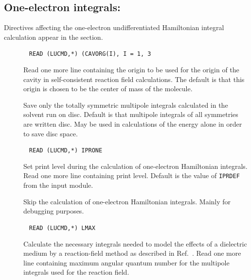 \subsection{One-electron integrals: }
\label{sec:oneinp}

Directives affecting the one-electron undifferentiated Hamiltonian
integral calculation appear in the  section.
\begin{description}
\item[]\verb| |\newline
\verb|READ (LUCMD,*) (CAVORG(I), I = 1, 3|

Read one more line containing the origin to be used for the origin of
the cavity in self-consistent reaction field
calculations. The default
is that this origin is chosen to be the center of mass of the molecule.

\item[] Save only the totally symmetric multipole integrals
calculated in the solvent run on disc. Default is that multipole
integrals of all symmetries are written disc. May be used in
calculations of the energy alone in order to save disc space.

\item[]\verb| |\newline
\verb|READ (LUCMD,*) IPRONE|

Set print level during the calculation of one-electron Hamiltonian
integrals.  Read one more line containing print level. Default is
the value of \verb|IPRDEF| from the  input module.

\item[] Skip the calculation of one-electron Hamiltonian
integrals. Mainly for debugging purposes.

\item[]\verb| |\newline
\verb|READ (LUCMD,*) LMAX|


Calculate the necessary integrals needed to model the effects of a
dielectric medium by a
reaction-field method as
described in
Ref.~\cite{kvmhahjajthjcp89}.  Read one more line containing maximum
angular quantum
number for the multipole integrals used for
the reaction field.
\end{description}

